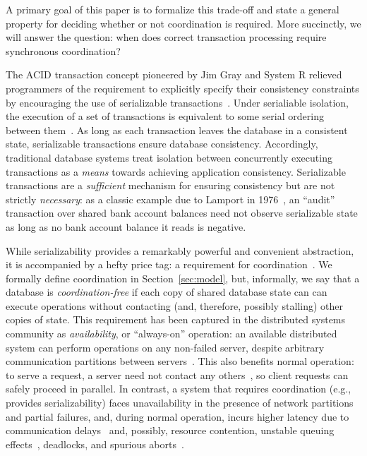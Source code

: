 A primary goal of this paper is to formalize this trade-off and state
a general property for deciding whether or not coordination is
required. More succinctly, we will answer the question: when does
correct transaction processing require synchronous coordination?


 The ACID transaction concept
pioneered by Jim Gray and System R relieved programmers of the
requirement to explicitly specify their consistency constraints by
encouraging the use of serializable
transactions~\cite{gray-virtues}. Under serialiable isolation, the
execution of a set of transactions is equivalent to some serial
ordering between them~\cite{bernstein-book}. As long as each
transaction leaves the database in a consistent state, serializable
transactions ensure database consistency. Accordingly, traditional
database systems treat isolation between concurrently executing
transactions as a \textit{means} towards achieving application
consistency. Serializable transactions are a \textit{sufficient}
mechanism for ensuring consistency but are not strictly
\textit{necessary}: as a classic example due to Lamport in
1976~\cite{lamport-audit}, an ``audit'' transaction over shared bank
account balances need not observe serializable state as long as no
bank account balance it reads is negative.


 While serializability provides a
remarkably powerful and convenient abstraction, it is accompanied by a
hefty price tag: a requirement for
coordination~\cite{davidson-survey}. We formally define coordination
in Section~\ref{sec:model}, but, informally, we say that a database is
\textit{coordination-free} if each copy of shared database state can
can execute operations without contacting (and, therefore, possibly
stalling) other copies of state. This requirement has been captured in
the distributed systems community as \textit{availability}, or
``always-on'' operation: an available distributed system can perform
operations on any non-failed server, despite arbitrary communication
partitions between servers~\cite{gilbert-cap}. This also benefits
normal operation: to serve a request, a \cfree server need not contact
any others~\cite{pacelc}, so client requests can safely proceed in
parallel. In contrast, a system that requires coordination (e.g.,
provides serializability) faces unavailability in the presence of
network partitions and partial failures, and, during normal operation,
incurs higher latency due to communication delays~\cite{hat-vldb} and,
possibly, resource contention, unstable queuing effects~\cite{ladis},
deadlocks, and spurious
aborts~\cite{bernstein-book,gray-book,gray-virtues}.

